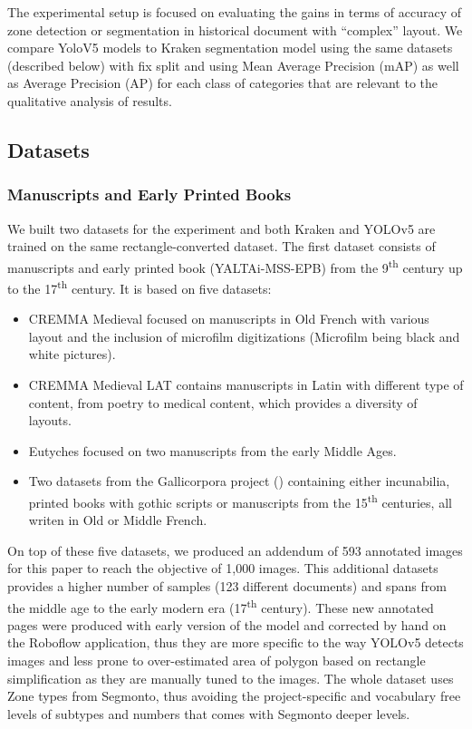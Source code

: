 \documentclass{jdmdh}
\begin{document}
The experimental setup is focused on evaluating the gains in terms of accuracy of zone detection or segmentation in historical document with ``complex'' layout. We compare YoloV5 models to Kraken segmentation model using the same datasets (described below) with fix split and using Mean Average Precision (mAP) as well as Average Precision (AP) for each class of categories that are relevant to the qualitative analysis of results.

\subsection{Datasets}

\subsubsection{Manuscripts and Early Printed Books}

We built two datasets for the experiment and both Kraken and YOLOv5 are trained on the same rectangle-converted dataset. The first dataset consists of manuscripts and early printed book (YALTAi-MSS-EPB) from the 9\textsuperscript{th} century up to the 17\textsuperscript{th} century. It is based on five datasets:

\begin{itemize}
    \item CREMMA Medieval \citep{pinche2022cremma} focused on manuscripts in Old French with various layout and the inclusion of microfilm digitizations (Microfilm being black and white pictures).
    \item CREMMA Medieval LAT \citep{clerice2022cremma} contains manuscripts in Latin with different type of content, from poetry to medical content, which provides a diversity of layouts.
    \item Eutyches \citep{vlachou-efstathiou2022voss} focused on two manuscripts from the early Middle Ages.
    \item Two datasets from the Gallicorpora project (\citep{pinche2022mss, pinche2022goth}) containing either incunabilia, printed books with gothic scripts or manuscripts from the 15\textsuperscript{th} centuries, all writen in Old or Middle French.
\end{itemize}

On top of these five datasets, we produced an addendum of 593 annotated images for this paper to reach the objective of 1,000 images. This additional datasets provides a higher number of samples (123 different documents) and spans from the middle age to the early modern era (17\textsuperscript{th} century). These new annotated pages were produced with early version of the model and corrected by hand on the Roboflow application, thus they are more specific to the way YOLOv5 detects images and less prone to over-estimated area of polygon based on rectangle simplification as they are manually tuned to the images. The whole dataset uses Zone types from Segmonto, thus avoiding the project-specific and vocabulary free levels of subtypes and numbers that comes with Segmonto deeper levels. 
\end{document}
